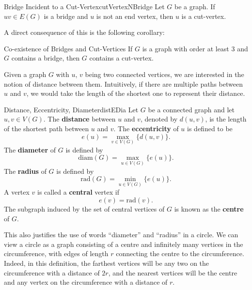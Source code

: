 \documentclass[math]{amznotes}
\theoremstyle{remark}
\begin{document}
\begin{probox}{Bridge Incident to a Cut-Vertex}{cutVertexNBridge}
    Let $G$ be a graph. If $uv \in E(G)$ is a bridge and $u$ is not an end vertex, then $u$ is a cut-vertex.
\end{probox}
A direct consequence of this is the following corollary:
\begin{corbox}{Co-existence of Bridges and Cut-Vertices}{}
    If $G$ is a graph with order at least $3$ and $G$ contains a bridge, then $G$ contains a cut-vertex.
\end{corbox}
Given a graph $G$ with $u$, $v$ being two connected vertices, we are interested in the notion of distance between them. Intuitively, if there are multiple paths between $u$ and $v$, we would take the length of the shortest one to represent their distance.
\begin{dfnbox}{Distance, Eccentricity, Diameter}{distEDia}
    Let $G$ be a connected graph and let $u, v \in V(G)$. The {\color{red} \textbf{distance}} between $u$ and $v$, denoted by $d(u, v)$, is the length of the shortest path between $u$ and $v$. The {\color{red} \textbf{eccentricity}} of $u$ is defined to be
    \begin{equation*}
        e(u) = \max_{v \in V(G)}\{d(u, v)\}.
    \end{equation*}
    The {\color{red} \textbf{diameter}} of $G$ is defined by
    \begin{equation*}
        \mathrm{diam}(G) = \max_{u \in V(G)}\{e(u)\}.
    \end{equation*}
    The {\color{red} \textbf{radius}} of $G$ is defined by
    \begin{equation*}
        \mathrm{rad}(G) = \min_{u \in V(G)}\{e(u)\}.
    \end{equation*}
    A vertex $v$ is called a {\color{red} \textbf{central}} vertex if
    \begin{equation*}
        e(v) = \mathrm{rad}(v).
    \end{equation*}
    The subgraph induced by the set of central vertices of $G$ is known as the {\color{red} \textbf{centre}} of $G$.
\end{dfnbox}
This also justifies the use of words ``diameter'' and ``radius'' in a circle. We can view a circle as a graph consisting of a centre and infinitely many vertices in the circumference, with edges of length $r$ connecting the centre to the circumference. Indeed, in this definition, the farthest vertices will be any two on the circumference with a distance of $2r$, and the nearest vertices will be the centre and any vertex on the circumference with a distance of $r$.
\end{document}
